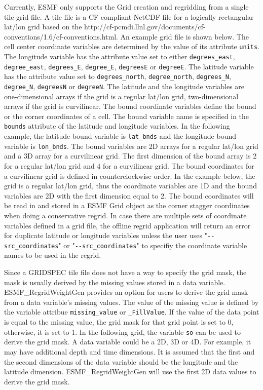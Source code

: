 Currently, ESMF only supports the Grid creation and regridding from a single tile grid file.  A tile file 
is a CF compliant NetCDF file for a logically rectangular lat/lon grid based on the
 {http://cf-pcmdi.llnl.gov/documents/cf-conventions/1.6/cf-conventions.html}.   An example grid file is shown below.  
The cell center coordinate variables are determined by the value of its attribute {\tt units}.  The longitude 
variable has the attribute value set to either {\tt degrees\_east}, {\tt degree\_east}, {\tt degrees\_E}, {\tt degree\_E},
{\tt degreesE} or {\tt degreeE}.  The latitude variable has the attribute value set to {\tt degrees\_north}, {\tt degree\_north}, {\tt degrees\_N},
{\tt degree\_N}, {\tt degreesN} or {\tt degreeN}.   The latitude and the longitude variables are one-dimensional arrays if the grid is a regular lat/lon grid, two-dimensional arrays if the grid is curvilinear. The bound coordinate 
variables define the bound or the corner coordinates of a cell.  The bound variable name is specified in the
{\tt bounds} attribute of the latitude and longitude variables.  In the following example, the latitude bound 
variable is {\tt lat\_bnds} and the longitude bound variable is {\tt lon\_bnds}.  The bound variables are 2D
arrays for a regular lat/lon grid and a 3D array for a curvilinear grid.  The first dimension of the bound 
array is 2 for a regular lat/lon grid and 4 for a curvilinear grid.  The bound coordinates for a curvilinear
grid is defined in counterclockwise order.  In the example below, the grid is a regular lat/lon
grid, thus the coordinate variables are 1D and the bound variables are 2D with the first dimension equal to 2.
The bound coordinates will be read in and stored in a ESMF Grid object as the corner stagger coordinates when doing a conservative regrid.  In case there are multiple sets of coordinate variables defined in a grid file, 
the offline regrid application will return an error for duplicate latitude or longitude variables unless the user 
uses "{\tt \verb+--+src\_coordinates}" or "{\tt \verb+--+src\_coordinates}" to specifiy the coordinate variable names
to be used in the regrid.  

Since a GRIDSPEC tile file does not have a way to specify the grid mask, the mask is usually derived by the missing values stored in a data variable.  ESMF\_RegridWeightGen provides an option for users to
derive the grid mask from a data variable's missing values.  The value of the missing value is defined by the
variable attribue {\tt missing\_value} or {\tt \_FillValue}.  If the value of the data point is equal to the 
missing value, the grid mask for that grid point is set to 0, otherwise, it is set to 1.   In the following
grid, the variable {\tt so} can be used to derive the grid mask.  A data variable could be a 2D, 3D or 4D. 
For example, it may have additional depth and time dimensions.    
It is assumed that the first and the second dimensions of the data variable should be the longitude and the 
latitude dimension.  ESMF\_RegridWeightGen will use the first 2D data values to derive the grid mask.
 
